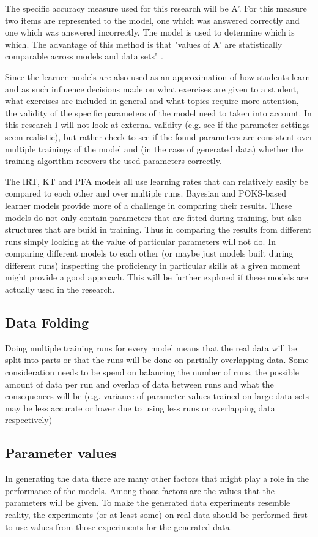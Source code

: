 \documentclass{article}
\begin{document}
The specific accuracy measure used for this research will be A'. For this measure two items are represented to the model, one which was answered correctly and one which was answered incorrectly. The model is used to determine which is which. The advantage of this method is that "values of A' are statistically comparable across models and data sets" \cite{modelreview}.

Since the learner models are also used as an approximation of how students learn and as such influence decisions made on what exercises are given to a student, what exercises are included in general and what topics require more attention, the validity of the specific parameters of the model need to taken into account. In this research I will not look at external validity (e.g. see if the parameter settings seem realistic), but rather check to see if the found parameters are consistent over multiple trainings of the model and (in the case of generated data) whether the training algorithm recovers the used parameters correctly.

The IRT, KT and PFA models all use learning rates that can relatively easily be compared to each other and over multiple runs. Bayesian and POKS-based learner models provide more of a challenge in comparing their results. These models do not only contain parameters that are fitted during training, but also structures that are build in training. Thus in comparing the results from different runs simply looking at the value of particular parameters will not do. In comparing different models to each other (or maybe just models built during different runs) inspecting the proficiency in particular skills at a given moment might provide a good approach. This will be further explored if these models are actually used in the research.

\subsection{Data Folding}
Doing multiple training runs for every model means that the real data will be split into parts or that the runs will be done on partially overlapping data. Some consideration needs to be spend on balancing the number of runs, the possible amount of data per run and overlap of data between runs and what the consequences will be (e.g. variance of parameter values trained on large data sets may be less accurate or lower due to using less runs or overlapping data respectively)

\subsection{Parameter values}
In generating the data there are many other factors that might play a role in the performance of the models. Among those factors are the values that the parameters will be given. To make the generated data experiments resemble reality, the experiments (or at least some) on real data should be performed first to use values from those experiments for the generated data.
\end{document}
